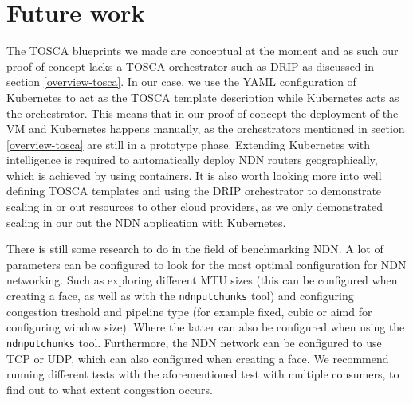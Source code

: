 \section{Future work}\label{fut}

The TOSCA blueprints we made are conceptual at the moment and as such our proof of concept lacks a TOSCA orchestrator such as DRIP as discussed in section \ref{overview-tosca}. In our case, we use the YAML configuration of Kubernetes to act as the TOSCA template description while Kubernetes acts as the orchestrator. This means that in our proof of concept the deployment of the VM and Kubernetes happens manually, as the orchestrators mentioned in section \ref{overview-tosca} are still in a prototype phase. 
Extending Kubernetes with intelligence is required to automatically deploy NDN routers geographically, which is achieved by using containers.
It is also worth looking more into well defining TOSCA templates and using the DRIP orchestrator to demonstrate scaling in or out resources to other cloud providers, as we only demonstrated scaling in our out the NDN application with Kubernetes. 


There is still some research to do in the field of benchmarking NDN. A lot of parameters can be configured to look for the most optimal configuration for NDN networking. Such as exploring different MTU sizes (this can be configured when creating a face, as well as with the \texttt{ndnputchunks} tool) and configuring congestion treshold and pipeline type (for example fixed, cubic or aimd for configuring window size). Where the latter can also be configured when using the \texttt{ndnputchunks} tool. Furthermore, the NDN network can be configured to use TCP or UDP, which can also configured when creating a face. We recommend running different tests with the aforementioned test with multiple consumers, to find out to what extent congestion occurs.


